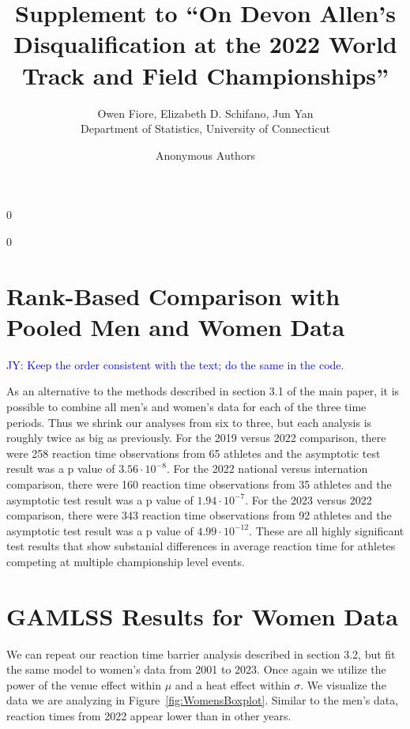 \documentclass[12pt, letterpaper]{article}
\newcommand{\jy}[1]{\textcolor{blue}{JY: #1}}
\newcommand{\blind}{0}
\begin{document}
\title{\bf Supplement to ``On Devon Allen's Disqualification at the 2022 World Track and Field Championships''}

\blind
{
  \author{Owen Fiore, %
  Elizabeth D. Schifano, %
  Jun Yan\\[1ex]
  Department of Statistics, University of Connecticut\\
}
} \fi

\blind
{
  \bigskip
  \bigskip
  \bigskip
  \author{Anonymous Authors}
  \bigskip
} \fi

\maketitle 

\section{Rank-Based Comparison with Pooled Men and Women Data}

\jy{Keep the order consistent with the text; do the same in the code.}

As an alternative to the methods described in section 3.1 of the main paper, it
is possible to combine all men's and women's data for each of the three time
periods.  Thus we shrink our analyses from six to three, but each analysis
is roughly twice as big as previously.  For the 2019 versus 2022 comparison,
there were 258 reaction time observations from 65 athletes and the asymptotic
test result was a p value of $3.56 \cdot 10^{-8}$. For the 2022 national versus
internation comparison, there were 160 reaction time observations from 35
athletes and the asymptotic test result was a p value of $1.94 \cdot 10^{-7}$.
For the 2023 versus 2022 comparison, there were 343 reaction time observations
from 92 athletes and the asymptotic test result was a p value of
$4.99 \cdot 10^{-12}$.  These are all highly significant test results that show
substanial differences in average reaction time for athletes competing at
multiple championship level events.


\section{GAMLSS Results for Women Data}
We can repeat our reaction time barrier analysis described in section 3.2, but
fit the same model to women's data from 2001 to 2023.  Once again we utilize
the power of the venue effect within $\mu$ and a heat effect within $\sigma$. 
We visualize the data we are analyzing in Figure~\ref{fig:WomensBoxplot}.
Similar to the men's data, reaction times from 2022 appear lower than in other
years.
\end{document}
